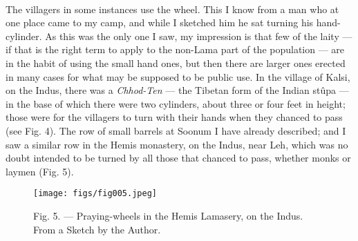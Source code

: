 \documentclass[a4paper, 11pt, oneside, polutonikogreek, english]{article}
\begin{document}
\paragraph{}
The villagers in some instances use the wheel. This I know from a man who at one place came to my camp, and while I sketched him he sat turning his hand-cylinder. As this was the only one I saw, my impression is that few of the laity --- if that is the right term to apply to the non-Lama part of the population --- are in the habit of using the small hand ones, but then there are larger ones erected in many cases for what may be supposed to be public use. In the village of Kalsi, on the Indus, there was a \emph{Chhod-Ten} --- the Tibetan form of the Indian stûpa --- in the base of which there were two cylinders, about three or four feet in height; those were for the villagers to turn with their hands when they chanced to pass (see Fig. 4). The row of small barrels at Soonum I have already described; and I saw a similar row in the Hemis monastery, on the Indus, near Leh, which was no doubt intended to be turned by all those that chanced to pass, whether monks or laymen (Fig. 5).

\begin{figure}[H]
\centering
\texttt{[image: figs/fig005.jpeg]}
\caption{Fig. 5. --- Praying-wheels in the Hemis Lamasery, on the Indus. From a Sketch by the Author.}
\end{figure}
\end{document}
